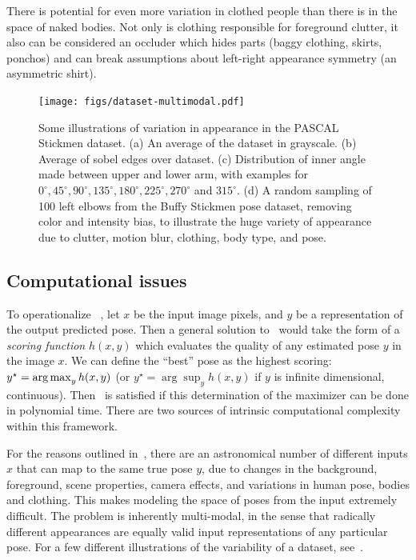  There is potential for even more variation in clothed people 
than there is in the space of naked bodies.  Not only is clothing responsible 
for foreground clutter, it also can be considered an occluder which hides parts 
(\eg baggy clothing, skirts, ponchos) and can break assumptions about 
left-right appearance symmetry (\eg an asymmetric shirt).

 

\begin{figure}[tb]
\begin{center}
\texttt{[image: figs/dataset-multimodal.pdf]}
\caption[Variations in appearance]{Some illustrations of variation in 
appearance in the PASCAL Stickmen dataset.  (a) An average of the dataset in 
grayscale.  (b) Average of sobel edges over dataset.  (c) Distribution of inner 
angle made between upper and lower arm, with examples for 
$0^\circ,45^\circ,90^\circ,135^\circ,180^\circ,225^\circ,270^\circ$ and 
$315^\circ$. (d) A random sampling of 100 left elbows from the Buffy Stickmen 
pose dataset,	removing color and intensity bias, to illustrate the huge variety 
of appearance due to	clutter, motion blur, clothing, body type, and pose.  
\label{fig:dataset-multimodal}}
\end{center}
\end{figure}



\subsection{Computational issues}

To operationalize ~, let $x$ be the input image pixels, and $y$ 
be a representation of the output predicted pose.  Then a general solution 
to~ would take the form of a {\em scoring function} $h(x,y)$ 
which evaluates the quality of any estimated pose $y$ in the image $x$.  We can 
define the ``best'' pose as the highest scoring: $y^\star = \mathop{\arg\max}_y h(x,y)$ 
(or $y^\star = \arg\sup_y h(x,y)$ if $y$ is infinite dimensional, \eg 
continuous).  Then~ is satisfied if this determination of the 
maximizer can be done in polynomial time. There are two sources of intrinsic 
computational complexity within this framework. 

 For the reasons outlined 
in~, there are an astronomical number of different inputs 
$x$ that can map to the same true pose $y$, due to changes in the background, 
foreground, scene properties, camera effects, and variations in human pose, 
bodies and clothing.  This makes modeling the space of poses from the input 
extremely difficult.  The problem is inherently multi-modal, in the sense that 
radically different appearances are equally valid input representations of any 
particular pose.  For a few different illustrations of the variability of a 
dataset, see~. 

